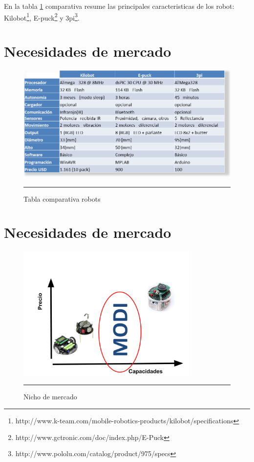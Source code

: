 En la tabla \ref{fig:Tabla robots} comparativa resume las principales caracteristicas de los robot: Kilobot\footnote{http://www.k-team.com/mobile-robotics-products/kilobot/specifications}, E-puck\footnote{http://www.gctronic.com/doc/index.php/E-Puck} y 3pi\footnote{http://www.pololu.com/catalog/product/975/specs}.



\section{Necesidades de mercado}
\begin{figure}[htbp]
	\centering
		\includegraphics[width=1\textwidth]{./Figures/tabla_robots.png}
		\rule{35em}{0.5pt}
	\caption[Tabla]{Tabla comparativa robots}
	\label{fig:Tabla robots}
\end{figure}


\section{Necesidades de mercado}
\begin{figure}[htbp]
	\centering
		\includegraphics[width=0.8\textwidth]{./Figures/nicho.png}
		\rule{35em}{0.5pt}
	\caption[nicho]{Nicho de mercado}
	\label{fig:nicho}
\end{figure}

